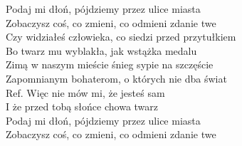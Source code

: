 \begin{flushleft}
\hspace{0.9cm}Podaj mi dłoń, pójdziemy przez ulice miasta \\
\hspace{0.9cm}Zobaczysz coś, co zmieni, co odmieni zdanie twe \\
\vskip 3mm
Czy widziałeś człowieka, co siedzi przed przytułkiem \\
Bo twarz mu wyblakła,  jak wstążka medalu \\
Zimą w naszym mieście śnieg sypie na szczęście \\
Zapomnianym bohaterom, o których nie dba świat \\
\vskip 3mm
Ref. Więc nie mów mi, że jesteś sam\\
\hspace{0.9cm}I że przed tobą słońce chowa twarz \\
\hspace{0.9cm}Podaj mi dłoń, pójdziemy przez ulice miasta \\
\hspace{0.9cm}Zobaczysz coś, co zmieni, co odmieni zdanie twe \\
\end{flushleft}
\clearpage
